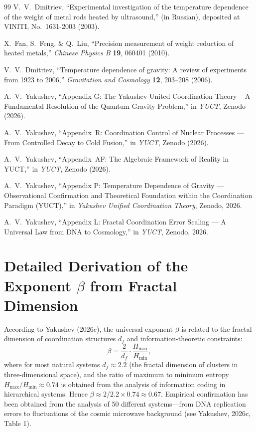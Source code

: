 \documentclass[12pt]{article}
\theoremstyle{remark}
\newcommand{\df}{d_{\!f}}
\begin{document}
\begin{thebibliography}{99}
		V.~V.~Dmitriev, ``Experimental investigation of the temperature dependence of the weight of metal rods heated by ultrasound,'' (in Russian), deposited at VINITI, No.~1631-2003 (2003).
		
		X.~Fan, S.~Feng, \& Q.~Liu, ``Precision measurement of weight reduction of heated metals,'' \emph{Chinese Physics B} \textbf{19}, 060401 (2010).
		
		V.~V.~Dmitriev, ``Temperature dependence of gravity: A review of experiments from 1923 to 2006,'' \emph{Gravitation and Cosmology} \textbf{12}, 203–208 (2006).
		
		A.~V.~Yakushev, ``Appendix G: The Yakushev United Coordination Theory -- A
		Fundamental Resolution of the Quantum Gravity Problem,''
		in \emph{YUCT}, Zenodo (2026).
		
		A.~V.~Yakushev, ``Appendix~R: Coordination Control of Nuclear Processes ---
		From Controlled Decay to Cold Fusion,''
		in \emph{YUCT}, Zenodo (2026).
		
		A.~V.~Yakushev, ``Appendix~AF: The Algebraic Framework of Reality in YUCT,''
		in \emph{YUCT}, Zenodo (2026).
		
		A.~V.~Yakushev, ``Appendix P: Temperature Dependence of Gravity — Observational Confirmation and Theoretical Foundation within the Coordination Paradigm (YUCT),'' in \emph{Yakushev Unified Coordination Theory}, Zenodo, 2026.
		
		A.~V.~Yakushev, ``Appendix L: Fractal Coordination Error Scaling — A Universal Law from DNA to Cosmology,'' in \emph{YUCT}, Zenodo, 2026.
		
	\end{thebibliography}
	
	\appendix
	
	\section{Detailed Derivation of the Exponent $\beta$ from Fractal Dimension}
	\label{app:beta-derivation}
	
	According to Yakushev (2026c), the universal exponent $\beta$ is related to the fractal dimension of coordination structures $\df$ and information-theoretic constraints:
	\begin{equation}
		\beta = \frac{2}{\df} \cdot \frac{H_{\text{max}}}{H_{\text{min}}},
		\label{eq:beta-derivation}
	\end{equation}
	where for most natural systems $\df \approx 2.2$ (the fractal dimension of clusters in three-dimensional space), and the ratio of maximum to minimum entropy $H_{\text{max}}/H_{\text{min}} \approx 0.74$ is obtained from the analysis of information coding in hierarchical systems. Hence $\beta \approx 2/2.2 \times 0.74 \approx 0.67$. Empirical confirmation has been obtained from the analysis of 50 different systems—from DNA replication errors to fluctuations of the cosmic microwave background (see Yakushev, 2026c, Table 1).
	
\end{document}
